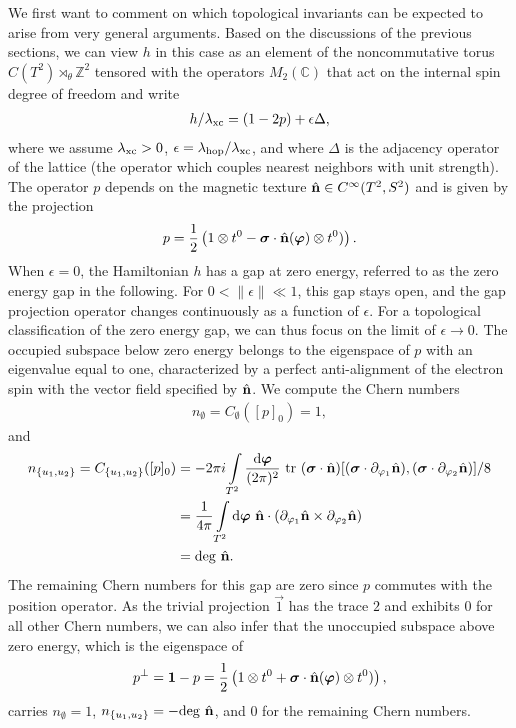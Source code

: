 \documentclass[submission, Phys]{SciPost}
\begin{document}
We first want to comment on which topological invariants can be expected to arise from very general arguments.
Based on the discussions of the previous sections, we can view $h$ in this case as an element of the noncommutative torus $C(T^2)\rtimes_\theta \mathbb{Z}^2$ tensored with the operators $M_2(\mathbb{C})$ that act on the internal spin degree of freedom and write
\begin{align}
    h / \lambda_\mathrm{xc} = (1-2 p)+\epsilon \Delta ,
\end{align}
where we assume $\lambda_\mathrm{xc}>0$, $\epsilon = \lambda_\mathrm{hop}/ \lambda_\mathrm{xc}$, and where $\Delta$ is the adjacency operator of the lattice (the operator which couples nearest neighbors with unit strength).
The operator $p$ depends on the magnetic texture $\hat{\mathbf{n}} \in C^\infty(T^2, S^2)$ and is given by the projection
\begin{align}
    p = \frac{1}{2}\left(
    1 \otimes t^0  - \boldsymbol{\sigma}\cdot \hat{\mathbf{n}}(\boldsymbol{\varphi}) \otimes t^0 )
    \right).
\end{align}
When $\epsilon=0$, the Hamiltonian $h$ has a gap at zero energy, referred to as the zero energy gap in the following. For $0<\| \epsilon \| \ll 1 $, this gap stays open, and the gap projection operator changes continuously as a function of $\epsilon$.
For a topological classification of the zero energy gap, we can thus focus on the limit of $\epsilon \to 0$.
The occupied subspace below zero energy belongs to the eigenspace of $p$ with an eigenvalue equal to one, characterized by a perfect anti-alignment of the electron spin with the vector field specified by $\hat{\mathbf{n}}$. 
We compute the Chern numbers
\begin{align}
    n_{\emptyset}=C_\emptyset([p]_0 ) = 1,
\end{align}
and 
\begin{align}
   n_{\lbrace u_1, u_2 \rbrace }= C_{\lbrace u_1, u_2 \rbrace }([p]_0 ) &= -2\pi i \int\limits_{T^2} \frac{\mathrm{d} \boldsymbol{\varphi}}{(2\pi)^2}~
     \mathrm{tr} ~(\boldsymbol{\sigma}\cdot \hat{\mathbf{n}}) [(\boldsymbol{\sigma}\cdot \partial_{\varphi_1}\hat{\mathbf{n}}),(\boldsymbol{\sigma}\cdot \partial_{\varphi_2}\hat{\mathbf{n}})] / 8
    \\
    &=
    \frac{1}{4 \pi} \int\limits_{T^2} \mathrm{d} \boldsymbol{\varphi}~
    \hat{\mathbf{n}} \cdot( \partial_{\varphi_1}\hat{\mathbf{n}} \times \partial_{\varphi_2}\hat{\mathbf{n}})
    \\
    &= \mathrm{deg}~\hat{\mathbf{n}} .
\end{align}
The remaining Chern numbers for this gap are zero since $p$ commutes with the position operator.
As the trivial projection $\vec{1}$ has the trace $2$ and exhibits $0$ for all other Chern numbers, we can also infer that the unoccupied subspace above zero energy, which is the eigenspace of
\begin{align}
    p^\perp=\boldsymbol{1}-p=\frac{1}{2}\left(1 \otimes t^0  + \boldsymbol{\sigma}\cdot \hat{\mathbf{n}}(\boldsymbol{\varphi}) \otimes t^0 ) \right),
\end{align}
carries $n_{\emptyset}=1$, $n_{\lbrace u_1, u_2 \rbrace }=-\mathrm{deg}~\hat{\mathbf{n}}$, and $0$ for the remaining Chern numbers.
\end{document}
